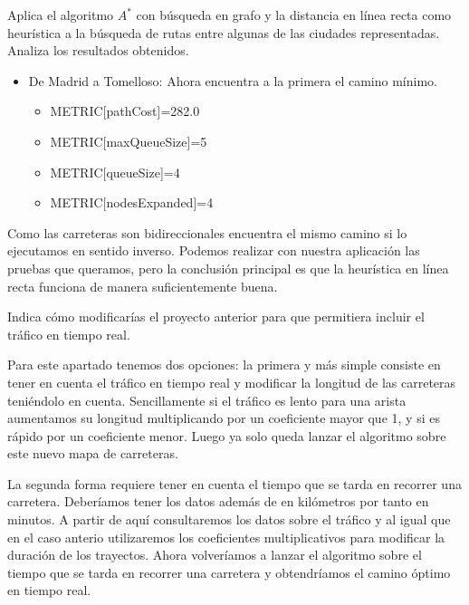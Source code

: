\documentclass[11pt, a4paper, spanish, openright, twoside]{book}
\begin{document}
\begin{section}{Aplica el algoritmo $A^*$ con búsqueda en grafo y la distancia en línea recta como heurística a la búsqueda de rutas entre algunas de las ciudades representadas. Analiza los resultados obtenidos.}
\begin{itemize}
				\item De Madrid a Tomelloso: Ahora encuentra a la primera el camino mínimo.
					
					\begin{itemize}
					\item METRIC[pathCost]=282.0
					\item METRIC[maxQueueSize]=5
					\item METRIC[queueSize]=4
					\item METRIC[nodesExpanded]=4
					
					\end{itemize}
				\end{itemize}


				Como las carreteras son bidireccionales encuentra el mismo camino si lo ejecutamos en sentido inverso. Podemos realizar con nuestra aplicación las pruebas que queramos, pero 
				la conclusión principal es que la heurística en línea recta funciona de manera suficientemente buena.
	\end{section}
	
	\begin{section}{Indica cómo modificarías el proyecto anterior para que permitiera incluir el tráfico en tiempo real.}
	
		Para este apartado tenemos dos opciones: la primera y más simple consiste en tener en cuenta el tráfico en tiempo real y modificar la longitud de las carreteras teniéndolo en cuenta. Sencillamente 
		si el tráfico es lento para una arista aumentamos su longitud multiplicando por un coeficiente mayor que 1, y si es rápido por un coeficiente menor. Luego ya solo queda lanzar el algoritmo sobre este 
		nuevo mapa de carreteras.

		La segunda forma requiere tener en cuenta el tiempo que se tarda en recorrer una carretera. Deberíamos tener los datos además de en kilómetros por tanto en minutos. A partir de aquí consultaremos los datos sobre el tráfico 
		y al igual que en el caso anterio utilizaremos los coeficientes multiplicativos para modificar la duración de los trayectos. Ahora volveríamos a lanzar el algoritmo sobre el tiempo que se tarda en recorrer una carretera y obtendríamos 
		el camino óptimo en tiempo real.


	\end{section}
\end{document}
